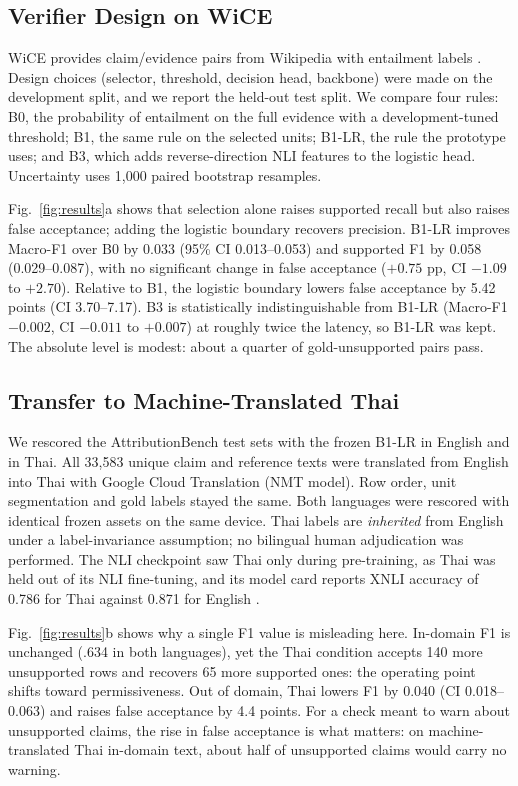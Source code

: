 \documentclass[runningheads]{llncs}
\begin{document}
\subsection{Verifier Design on WiCE}

WiCE provides claim/evidence pairs from Wikipedia with entailment labels
\cite{kamoi2023wice}. Design choices (selector, threshold, decision head, backbone) were made on the
development split, and we report the held-out test split. We compare four rules: B0, the probability of
entailment on the full evidence with a development-tuned threshold; B1, the same rule on the
selected units; B1-LR, the rule the prototype uses; and B3, which adds reverse-direction NLI
features to the logistic head. Uncertainty uses 1,000 paired bootstrap resamples.


Fig.~\ref{fig:results}a shows that selection alone raises supported recall but also raises false
acceptance; adding the logistic boundary recovers precision. B1-LR improves Macro-F1 over B0
by 0.033 (95\% CI 0.013--0.053) and supported F1 by 0.058 (0.029--0.087), with no significant
change in false acceptance ($+0.75$ pp, CI $-1.09$ to $+2.70$). Relative to B1, the logistic
boundary lowers false acceptance by 5.42 points (CI 3.70--7.17). B3 is statistically
indistinguishable from B1-LR (Macro-F1 $-0.002$, CI $-0.011$ to $+0.007$) at roughly twice the
latency, so B1-LR was kept. The absolute level is modest: about a quarter of gold-unsupported pairs
pass.

\subsection{Transfer to Machine-Translated Thai}\label{sec:mtth}

We rescored the AttributionBench test sets with the frozen B1-LR in English and in Thai. All 33,583
unique claim and reference texts were translated from English into Thai with Google Cloud Translation (NMT
model). Row order, unit segmentation and gold labels stayed the same. Both languages were rescored with
identical frozen assets on the same device. Thai labels are \emph{inherited} from English under a
label-invariance assumption; no bilingual human adjudication was performed. The NLI checkpoint saw Thai only during pre-training, as Thai was held out of its NLI fine-tuning,
and its model card reports XNLI accuracy of 0.786 for Thai against 0.871 for English
\cite{laurer2022mdeberta}.


Fig.~\ref{fig:results}b shows why a single F1 value is misleading here. In-domain F1 is
unchanged (.634 in both languages), yet the Thai condition accepts 140 more unsupported rows and
recovers 65 more supported ones: the operating point shifts toward permissiveness. Out of domain,
Thai lowers F1 by 0.040 (CI 0.018--0.063) and raises false acceptance by 4.4 points. For a check meant
to warn about unsupported claims, the rise in false acceptance is what
matters: on machine-translated Thai in-domain text, about half of unsupported claims would carry no warning.
\end{document}
